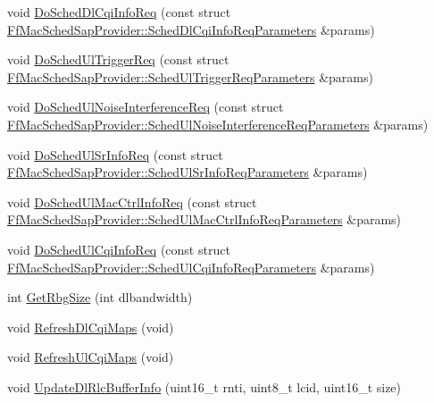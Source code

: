 \begin{DoxyCompactItemize}
\item 
void \hyperlink{classns3_1_1RrFfMacScheduler_ab6e3d14c7af37ab2e7f29c839b66ff4f}{Do\+Sched\+Dl\+Cqi\+Info\+Req} (const struct \hyperlink{structns3_1_1FfMacSchedSapProvider_1_1SchedDlCqiInfoReqParameters}{Ff\+Mac\+Sched\+Sap\+Provider\+::\+Sched\+Dl\+Cqi\+Info\+Req\+Parameters} \&params)
\item 
void \hyperlink{classns3_1_1RrFfMacScheduler_aa10f6f7a60107f3325456813cbba3a99}{Do\+Sched\+Ul\+Trigger\+Req} (const struct \hyperlink{structns3_1_1FfMacSchedSapProvider_1_1SchedUlTriggerReqParameters}{Ff\+Mac\+Sched\+Sap\+Provider\+::\+Sched\+Ul\+Trigger\+Req\+Parameters} \&params)
\item 
void \hyperlink{classns3_1_1RrFfMacScheduler_add4db62c7b84c304f914e4a742d1e1f4}{Do\+Sched\+Ul\+Noise\+Interference\+Req} (const struct \hyperlink{structns3_1_1FfMacSchedSapProvider_1_1SchedUlNoiseInterferenceReqParameters}{Ff\+Mac\+Sched\+Sap\+Provider\+::\+Sched\+Ul\+Noise\+Interference\+Req\+Parameters} \&params)
\item 
void \hyperlink{classns3_1_1RrFfMacScheduler_abb28bf8bd2dd75d8fbb85129c1c4bd5d}{Do\+Sched\+Ul\+Sr\+Info\+Req} (const struct \hyperlink{structns3_1_1FfMacSchedSapProvider_1_1SchedUlSrInfoReqParameters}{Ff\+Mac\+Sched\+Sap\+Provider\+::\+Sched\+Ul\+Sr\+Info\+Req\+Parameters} \&params)
\item 
void \hyperlink{classns3_1_1RrFfMacScheduler_aa9c8c5154cb86f8eab97287abeb52f48}{Do\+Sched\+Ul\+Mac\+Ctrl\+Info\+Req} (const struct \hyperlink{structns3_1_1FfMacSchedSapProvider_1_1SchedUlMacCtrlInfoReqParameters}{Ff\+Mac\+Sched\+Sap\+Provider\+::\+Sched\+Ul\+Mac\+Ctrl\+Info\+Req\+Parameters} \&params)
\item 
void \hyperlink{classns3_1_1RrFfMacScheduler_a7e3e72a957e11b4038c1a89604ff302b}{Do\+Sched\+Ul\+Cqi\+Info\+Req} (const struct \hyperlink{structns3_1_1FfMacSchedSapProvider_1_1SchedUlCqiInfoReqParameters}{Ff\+Mac\+Sched\+Sap\+Provider\+::\+Sched\+Ul\+Cqi\+Info\+Req\+Parameters} \&params)
\item 
int \hyperlink{classns3_1_1RrFfMacScheduler_a65de621ce59a64d6b0a3a56c3904470a}{Get\+Rbg\+Size} (int dlbandwidth)
\item 
void \hyperlink{classns3_1_1RrFfMacScheduler_a537ddfed33bced7f9a5762128e025ece}{Refresh\+Dl\+Cqi\+Maps} (void)
\item 
void \hyperlink{classns3_1_1RrFfMacScheduler_ab28ac1b62c16252bfff55825dfbcd701}{Refresh\+Ul\+Cqi\+Maps} (void)
\item 
void \hyperlink{classns3_1_1RrFfMacScheduler_a579580e9727897effc77801086e413ab}{Update\+Dl\+Rlc\+Buffer\+Info} (uint16\+\_\+t rnti, uint8\+\_\+t lcid, uint16\+\_\+t size)

\end{DoxyCompactItemize}
